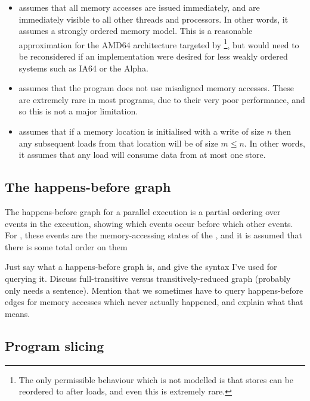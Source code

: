 \begin{itemize}
\item
  {\Technique} assumes that all memory accesses are issued
  immediately, and are immediately visible to all other threads and
  processors.  In other words, it assumes a strongly ordered memory
  model.  This is a reasonable approximation for the AMD64
  architecture targeted by {\implementation}\footnote{The only
    permissible behaviour which is not modelled is that stores can be
    reordered to after loads, and even this is extremely rare.}, but
  would need to be reconsidered if an implementation were desired for
  less weakly ordered systems such as IA64 or the Alpha.
\item
  {\Technique} assumes that the program does not use misaligned memory
  accesses.  These are extremely rare in most programs, due to their
  very poor performance, and so this is not a
  major limitation.
\item
  {\Implementation} assumes that if a memory location is initialised
  with a write of size $n$ then any subsequent loads from that
  location will be of size $m \le n$.  In other words, it assumes that
  any load will consume data from at most one store.  
\end{itemize}

\subsection{The happens-before graph}

The happens-before graph for a parallel execution is a partial
ordering over events in the execution, showing which events occur
before which other events\needCite{}.  For {\technique}, these events
are the memory-accessing states of the {\StateMachine}, and it is
assumed that there is some total order on them


Just say what a happens-before graph is, and give the syntax I've used
for querying it.  Discuss full-transitive versus transitively-reduced
graph (probably only needs a sentence).  Mention that we sometimes
have to query happens-before edges for memory accesses which never
actually happened, and explain what that means.

\subsection{Program slicing}

